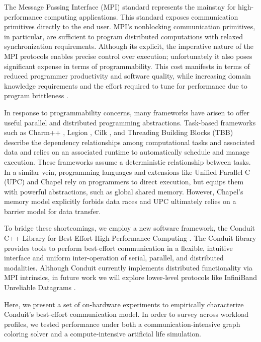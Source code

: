 The Message Passing Interface (MPI) standard \citep{gropp1996high} represents the mainstay for high-performance computing applications.
This standard exposes communication primitives directly to the end user.
MPI's nonblocking communication primitives, in particular, are sufficient to program distributed computations with relaxed synchronization requirements.
Although its explicit, the imperative nature of the MPI protocols enables precise control over execution; unfortunately it also poses significant expense in terms of programmability.
This cost manifests in terms of reduced programmer productivity and software quality, while increasing domain knowledge requirements and the effort required to tune for performance due to program brittleness \citep{gu2019comparative, tang2014mpi}.

In response to programmability concerns, many frameworks have arisen to offer useful parallel and distributed programming abstractions.
Task-based frameworks such as Charm++ \citep{kale1993charm++}, Legion \citep{bauer2012legion}, Cilk \citep{blumofe1996cilk}, and Threading Building Blocks (TBB) \citep{reinders2007intel} describe the dependency relationships among computational tasks and associated data and relies on an associated runtime to automatically schedule and manage execution.
These frameworks assume a deterministic relationship between tasks.
In a similar vein, programming languages and extensions like Unified Parallel C (UPC) \citep{el2006upc} and Chapel \citep{chamberlain2007parallel} rely on programmers to direct execution, but equips them with powerful abstractions, such as global shared memory.
However, Chapel's memory model explicitly forbids data races and UPC ultimately relies on a barrier model for data transfer.

To bridge these shortcomings, we employ a new software framework, the Conduit C++ Library for Best-Effort High Performance Computing \citep{moreno2021conduit}.
The Conduit library provides tools to perform best-effort communication in a flexible, intuitive interface and uniform inter-operation of serial, parallel, and distributed modalities.
Although Conduit currently implements distributed functionality via MPI intrinsics, in future work we will explore lower-level protocols like InfiniBand Unreliable Datagrams \citep{kashyap2006ip, koop2007high}.

Here, we present a set of on-hardware experiments to empirically characterize Conduit's best-effort communication model.
In order to survey across workload profiles, we tested performance under both a communication-intensive graph coloring solver and a compute-intensive artificial life simulation.

